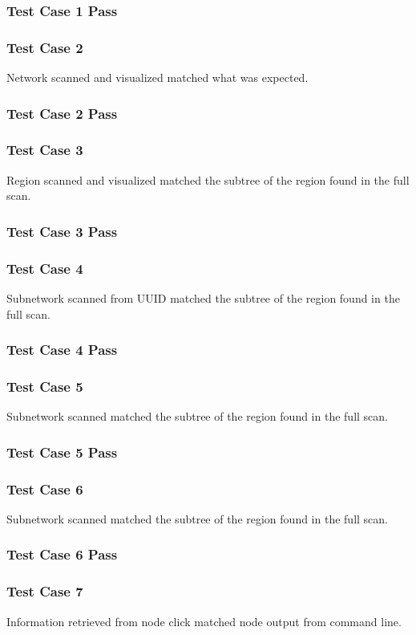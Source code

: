 \documentclass[hidelinks,a4paper,12pt]{article}
\begin{document}
\subsubsection{Test Case 1 Pass}
\subsubsection{Test Case 2}
Network scanned and visualized matched what was expected.
\subsubsection{Test Case 2 Pass}
\subsubsection{Test Case 3}
Region scanned and visualized matched the subtree of the region found in the full scan.
\subsubsection{Test Case 3 Pass}
\subsubsection{Test Case 4}
Subnetwork scanned from UUID matched the subtree of the region found in the full scan.
\subsubsection{Test Case 4 Pass}
\subsubsection{Test Case 5}
Subnetwork scanned matched the subtree of the region found in the full scan.
\subsubsection{Test Case 5 Pass}
\subsubsection{Test Case 6}
Subnetwork scanned matched the subtree of the region found in the full scan.
\subsubsection{Test Case 6 Pass}
\subsubsection{Test Case 7}
Information retrieved from node click matched node output from command line.
\end{document}
